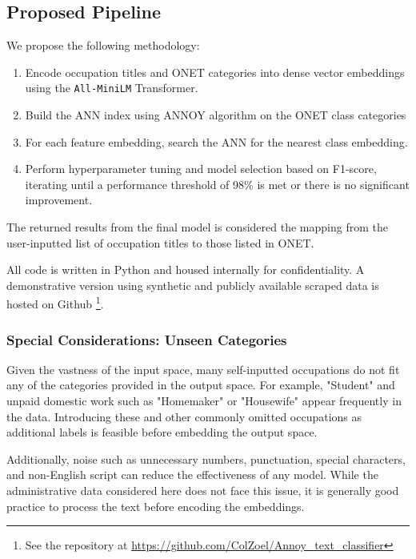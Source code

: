 \documentclass[12pt]{article}
\begin{document}
\subsection{Proposed Pipeline}
We propose the following methodology:

\begin{enumerate}
    \item Encode occupation titles and ONET categories into dense vector embeddings using the \texttt{All-MiniLM} Transformer.
    \item Build the ANN index using ANNOY algorithm on the ONET class categories
    \item For each feature embedding, search the ANN for the nearest class embedding.
    \item Perform hyperparameter tuning and model selection based on F1-score, iterating until a performance threshold of 98\% is met or there is no significant improvement.
\end{enumerate}

The returned results from the final model is considered the mapping from the user-inputted list of occupation titles to those listed in ONET. 

All code is written in Python and housed internally for confidentiality. A demonstrative version using synthetic and publicly available scraped data is hosted on Github \footnote{See the repository at \href{https://github.com/ColZoel/Annoy_text_classifier}{https://github.com/ColZoel/Annoy\_text\_classifier}}. 

\subsubsection{Special Considerations: Unseen Categories}
Given the vastness of the input space, many self-inputted occupations do not fit any of the categories provided in the output space. For example, "Student" and unpaid domestic work such as "Homemaker" or "Housewife" appear frequently in the data. Introducing these and other commonly omitted occupations as additional labels is feasible before embedding the output space. 

Additionally, noise such as unnecessary numbers, punctuation, special characters, and non-English script can reduce the effectiveness of any model. While the administrative data considered here does not face this issue, it is generally good practice to process the text before encoding the embeddings. 
\end{document}

